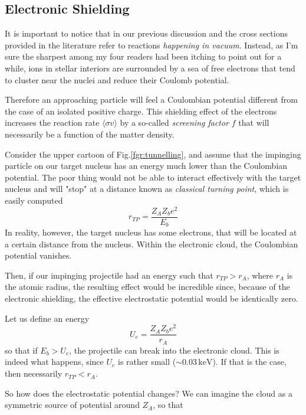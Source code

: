 \subsection{Electronic Shielding}
It is important to notice that in our previous discussion and the cross sections provided in the literature refer to reactions \emph{happening in vacuum}. Instead, as I'm sure the sharpest among my four readers had been itching to point out for a while, ions in stellar interiors are surrounded by a sea of free electrons that tend to cluster near the nuclei and reduce their Coulomb potential.
\par Therefore an approaching particle will feel a Coulombian potential different from the case of an isolated positive charge. This shielding effect of the electrons increases the reaction rate $\langle \sigma v \rangle$ by a so-called \emph{screening factor} $f$ that will necessarily be a function of the matter density.
\par Consider the upper cartoon of Fig.\ref{fgr:tunnelling}, and assume that the impinging particle on our target nucleus has an energy much lower than the Coulombian potential. The poor thing would not be able to interact effectively with the target nucleus and will "stop" at a distance known as \emph{classical turning point}, which is easily computed 
\begin{equation}
    r_{TP} = \frac{Z_{A}Z_{b}e^{2}}{E_{b}}
    \label{eq:classicalturningpointradius}
\end{equation}
In reality, however, the target nucleus has some electrons, that will be located at a certain distance from the nucleus. Within the electronic cloud, the Coulombian potential vanishes.
\par Then, if our impinging projectile had an energy such that $r_{TP}>r_{A}$, where $r_{A}$ is the atomic radius, the resulting effect would be incredible since, because of the electronic shielding, the effective electrostatic potential would be identically zero.
\par Let us define an energy 
\begin{equation*}
    U_{e} = \frac{Z_{A}Z_{b}e^{2}}{r_{A}}
\end{equation*}
so that if $E_{b}>U_{e}$, the projectile can break into the electronic cloud. This is indeed what happens, since $U_{e}$ is rather small ($\sim 0.03\,\text{keV}$). If that is the case, then necessarily $r_{TP}<r_{A}$.
\par So how does the electrostatic potential changes? We can imagine the cloud as a symmetric source of potential around $Z_{A}$, so that
